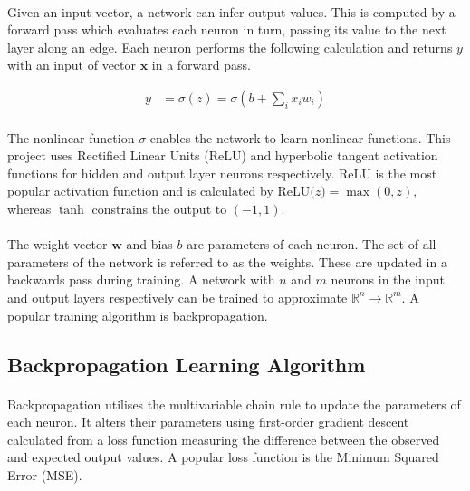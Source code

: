 \documentclass[12pt,a4paper]{book}
\begin{document}
\paragraph{} Given an input vector, a network can infer output values. This is computed by a forward pass which evaluates each neuron in turn, passing its value to the next layer along an edge. Each neuron performs the following calculation and returns $y$ with an input of vector $\textbf{x}$ in a forward pass.\cite{deeplearn}

\begin{align*}
  y &= \sigma(z) = \sigma \left(b + \sum_{i} x_{i} w_{i} \right)
\end{align*}

\paragraph{} The nonlinear function $\sigma$ enables the network to learn nonlinear functions. This project uses Rectified Linear Units (ReLU) and hyperbolic tangent activation functions for hidden and output layer neurons respectively. ReLU is the most popular activation function and is calculated by $\textrm{ReLU(}z) = \max(0, z)$, whereas $\tanh$ constrains the output to $(-1, 1)$. \cite{deeplearn}

\paragraph{} The weight vector $\textbf{w}$ and bias $b$ are parameters of each neuron. The set of all parameters of the network is referred to as the weights. These are updated in a backwards pass during training. A network with $n$ and $m$ neurons in the input and output layers respectively can be trained to approximate $\mathbb{R}^{n} \rightarrow \mathbb{R}^{m}$. A popular training algorithm is backpropagation. \cite{deeplearn}

\subsection{Backpropagation Learning Algorithm}

\paragraph{} Backpropagation utilises the multivariable chain rule to update the parameters of each neuron. It alters their parameters using first-order gradient descent calculated from a loss function measuring the difference between the observed and expected output values. A popular loss function is the Minimum Squared Error (MSE). \cite{deeplearn}
\end{document}
